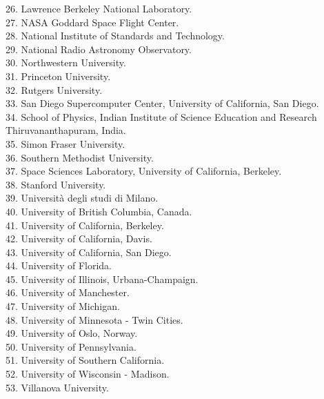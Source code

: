 \documentclass[PICOReport.tex]{subfiles}
\begin{document}
\begin{multicols}{2}
{26. Lawrence Berkeley National Laboratory.  \\
27. NASA Goddard Space Flight Center.  \\
28. National Institute of Standards and Technology.  \\
29. National Radio Astronomy Observatory.  \\
30. Northwestern University.  \\
31. Princeton University.  \\
32. Rutgers University.  \\
33. San Diego Supercomputer Center, University of California, San Diego.  \\
34. School of Physics, Indian Institute of Science Education and Research Thiruvananthapuram,  India.  \\
35. Simon Fraser University.  \\
36. Southern Methodist University.  \\
37. Space Sciences Laboratory, University of California, Berkeley.  \\
38. Stanford University.  \\
39. Universit\`a degli studi di Milano.  \\
40. University of British Columbia, Canada.  \\
41. University of California, Berkeley.  \\
42. University of California, Davis.  \\
43. University of California, San Diego.  \\
44. University of Florida.  \\
45. University of Illinois, Urbana-Champaign.  \\
46. University of Manchester.  \\
47. University of Michigan.  \\
48. University of Minnesota - Twin Cities.  \\
49. University of Oslo, Norway.  \\
50. University of Pennsylvania.  \\
51. University of Southern California.  \\
52. University of Wisconsin - Madison.  \\
53. Villanova University.  \\
}
\end{multicols}
\end{document}
